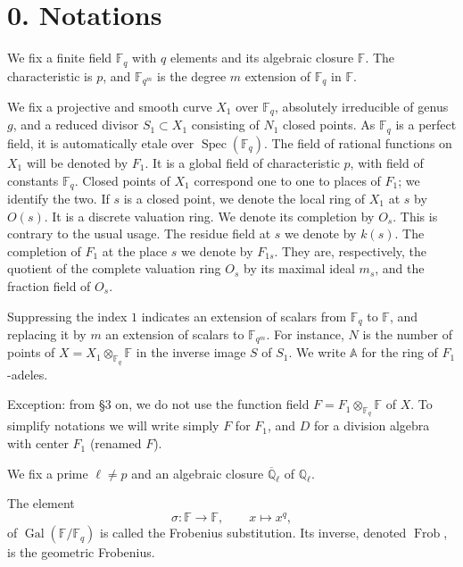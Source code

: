 \documentclass[10pt]{article}
\newcommand{\Fq}{\mathbb F_q}
\newcommand{\Fqm}{\mathbb F_{q^m}}
\newcommand{\Fb}{\mathbb F}
\newcommand{\Ql}{\overline{\mathbb Q}_{\ell}}
\newcommand{\Adele}{\mathbb A}
\newcommand{\Gal}{\operatorname{Gal}}
\newcommand{\Spec}{\operatorname{Spec}}
\newcommand{\Frob}{\operatorname{Frob}}
\theoremstyle{deligne}
\newcommand{\heading}[1]{\vspace{0.7em}\noindent{\bfseries #1}\quad}
\begin{document}
\section*{0. Notations}

\heading{0.1.} We fix a finite field $\Fq$ with $q$ elements and its algebraic closure $\Fb$. The characteristic is $p$, and $\Fqm$ is the degree $m$ extension of $\Fq$ in $\Fb$.

\heading{0.2.} We fix a projective and smooth curve $X_1$ over $\Fq$, absolutely irreducible of genus $g$, and a reduced divisor $S_1\subset X_1$ consisting of $N_1$ closed points. As $\Fq$ is a perfect field, it is automatically etale over $\Spec(\Fq)$. The field of rational functions on $X_1$ will be denoted by $F_1$. It is a global field of characteristic $p$, with field of constants $\Fq$. Closed points of $X_1$ correspond one to one to places of $F_1$; we identify the two. If $s$ is a closed point, we denote the local ring of $X_1$ at $s$ by $O(s)$. It is a discrete valuation ring. We denote its completion by $O_s$. This is contrary to the usual usage. The residue field at $s$ we denote by $k(s)$. The completion of $F_1$ at the place $s$ we denote by $F_{1s}$. They are, respectively, the quotient of the complete valuation ring $O_s$ by its maximal ideal $m_s$, and the fraction field of $O_s$.

\heading{0.3.} Suppressing the index $1$ indicates an extension of scalars from $\Fq$ to $\Fb$, and replacing it by $m$ an extension of scalars to $\Fqm$. For instance, $N$ is the number of points of $X=X_1\otimes_{\Fq}\Fb$ in the inverse image $S$ of $S_1$. We write $\Adele$ for the ring of $F_1$-adeles.

Exception: from \S3 on, we do not use the function field $F=F_1\otimes_{\Fq}\Fb$ of $X$. To simplify notations we will write simply $F$ for $F_1$, and $D$ for a division algebra with center $F_1$ (renamed $F$).

\heading{0.4.} We fix a prime $\ell\ne p$ and an algebraic closure $\Ql$ of $\mathbb Q_\ell$.

\heading{0.5.} The element
\[
 \sigma:\Fb\longrightarrow\Fb,
 \qquad x\longmapsto x^q,
\]
of $\Gal(\Fb/\Fq)$ is called the Frobenius substitution. Its inverse, denoted $\Frob$, is the geometric Frobenius.
\end{document}
